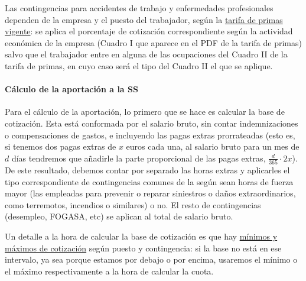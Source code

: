 \documentclass[nochap,palatino,notitlepage]{apuntes}
\begin{document}
Las contingencias para accidentes de trabajo y enfermedades profesionales dependen de la empresa y el puesto del trabajador, según la \href{http://www.seg-social.es/Internet_1/Trabajadores/CotizacionRecaudaci10777/TarifadePrimasdeATy48410/index.htm}{tarifa de primas vigente}: se aplica el porcentaje de cotización correspondiente según la actividad económica de la empresa (Cuadro I que aparece en el PDF de la tarifa de primas) salvo que el trabajador entre en alguna de las ocupaciones del Cuadro II de la tarifa de primas, en cuyo caso será el tipo del Cuadro II el que se aplique.

\paragraph{Cálculo de la aportación a la SS} Para el cálculo de la aportación, lo primero que se hace es calcular la base de cotización. Esta está conformada por el salario bruto, sin contar indemnizaciones o compensaciones de gastos\footnotemark, e incluyendo las pagas extras prorrateadas (esto es, si tenemos dos pagas extras de $x$ euros cada una, al salario bruto para un mes de $d$ días tendremos que añadirle la parte proporcional de las pagas extras, $\frac{d}{365} \cdot 2x $). De este resultado, debemos contar por separado las horas extras y aplicarles el tipo correspondiente de contingencias comunes de la  según sean horas de fuerza mayor (las empleadas para prevenir o reparar siniestros o daños extraordinarios, como terremotos, incendios o similares) o no. El resto de contingencias (desempleo, FOGASA, etc) se aplican al total de salario bruto.

Un detalle a la hora de calcular la base de cotización es que hay \href{http://www.seg-social.es/Internet_1/Trabajadores/CotizacionRecaudaci10777/Basesytiposdecotiza36537/index.htm}{mínimos y máximos de cotización} según puesto y contingencia: si la base no está en ese intervalo, ya sea porque estamos por debajo o por encima, usaremos el mínimo o el máximo respectivamente a la hora de calcular la cuota.

\end{document}
